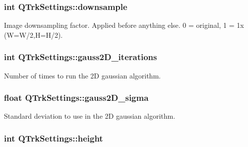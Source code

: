 \subsubsection[{\texorpdfstring{downsample}{downsample}}]{\setlength{\rightskip}{0pt plus 5cm}int Q\+Trk\+Settings\+::downsample}\hypertarget{struct_q_trk_settings_ad10a141ae7d18c2e6ce487f147dd7c02}{}\label{struct_q_trk_settings_ad10a141ae7d18c2e6ce487f147dd7c02}


Image downsampling factor. Applied before anything else. 0 = original, 1 = 1x (W=W/2,H=H/2). 

\subsubsection[{\texorpdfstring{gauss2\+D\+\_\+iterations}{gauss2D_iterations}}]{\setlength{\rightskip}{0pt plus 5cm}int Q\+Trk\+Settings\+::gauss2\+D\+\_\+iterations}\hypertarget{struct_q_trk_settings_aa5ae2b9e5700fe2eab58f9084389c3ad}{}\label{struct_q_trk_settings_aa5ae2b9e5700fe2eab58f9084389c3ad}


Number of times to run the 2D gaussian algorithm. 

\subsubsection[{\texorpdfstring{gauss2\+D\+\_\+sigma}{gauss2D_sigma}}]{\setlength{\rightskip}{0pt plus 5cm}float Q\+Trk\+Settings\+::gauss2\+D\+\_\+sigma}\hypertarget{struct_q_trk_settings_a950fc67c972c608570ef2dd27fcfaf4d}{}\label{struct_q_trk_settings_a950fc67c972c608570ef2dd27fcfaf4d}


Standard deviation to use in the 2D gaussian algorithm. 

\subsubsection[{\texorpdfstring{height}{height}}]{\setlength{\rightskip}{0pt plus 5cm}int Q\+Trk\+Settings\+::height}\hypertarget{struct_q_trk_settings_a94c965d103e7a0a4f1fced8eee1324ce}{}\label{struct_q_trk_settings_a94c965d103e7a0a4f1fced8eee1324ce}


